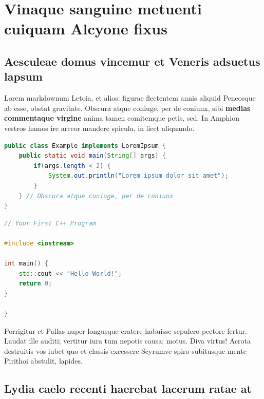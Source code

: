 

\hypertarget{vinaque-sanguine-metuenti-cuiquam-alcyone-fixus}{%
\section{Vinaque sanguine metuenti cuiquam Alcyone
fixus}\label{vinaque-sanguine-metuenti-cuiquam-alcyone-fixus}}

\hypertarget{aesculeae-domus-vincemur-et-veneris-adsuetus-lapsum}{%
\subsection{Aesculeae domus vincemur et Veneris adsuetus
lapsum}\label{aesculeae-domus-vincemur-et-veneris-adsuetus-lapsum}}

Lorem markdownum Letoia, et alios: figurae flectentem annis aliquid
Peneosque ab esse, obstat gravitate. Obscura atque coniuge, per de
coniunx, sibi \textbf{medias commentaque virgine} anima tamen comitemque
petis, sed. In Amphion vestros hamos ire arceor mandere spicula, in
licet aliquando.

\begin{lstlisting}[language=Java]
public class Example implements LoremIpsum {
    public static void main(String[] args) {
        if(args.length < 2) {
            System.out.println("Lorem ipsum dolor sit amet");
        }
    } // Obscura atque coniuge, per de coniunx
}
\end{lstlisting}

\begin{lstlisting}[language={C++}]
// Your First C++ Program

#include <iostream>

int main() {
    std::cout << "Hello World!";
    return 0;
}

}
\end{lstlisting}

Porrigitur et Pallas nuper longusque cratere habuisse sepulcro pectore
fertur. Laudat ille auditi; vertitur iura tum nepotis causa; motus. Diva
virtus! Acrota destruitis vos iubet quo et classis excessere Scyrumve
spiro subitusque mente Pirithoi abstulit, lapides.

\hypertarget{lydia-caelo-recenti-haerebat-lacerum-ratae-at}{%
\subsection{Lydia caelo recenti haerebat lacerum ratae
at}\label{lydia-caelo-recenti-haerebat-lacerum-ratae-at}}

